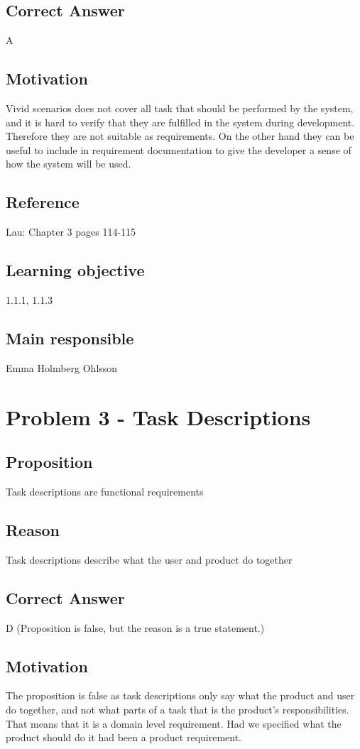 \documentclass[a4paper]{article}
\begin{document}
\subsection{Correct Answer}
A
\subsection{Motivation}
Vivid scenarios does not cover all task that should be performed by the system, and it is hard to verify that they are fulfilled in the system during development. Therefore they are not suitable as requirements. On the other hand they can be useful to include in requirement documentation to give the developer a sense of how the system will be used.
\subsection{Reference}
Lau: Chapter 3 pages 114-115
\subsection{Learning objective}
1.1.1, 1.1.3
\subsection{Main responsible}
Emma Holmberg Ohlsson


\section{Problem 3 - Task Descriptions}
\subsection{Proposition}
Task descriptions are functional requirements
\subsection{Reason}
Task descriptions describe what the user and product do together
\subsection{Correct Answer}
D (Proposition is false, but the reason is a true statement.)
\subsection{Motivation}
The proposition is false as task descriptions only say what the product and user do together, and not what parts of a task that is the product’s responsibilities. That means that it is a domain level requirement. Had we specified what the product should do it had been a product requirement.
\end{document}
